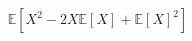 \documentclass[preview]{standalone}
\begin{document}
\begin{align*}
\mathbb{E}\left[X^2 - 2X\mathbb{E}[X] + \mathbb{E}[X]^2\right]
\end{align*}
\end{document}

